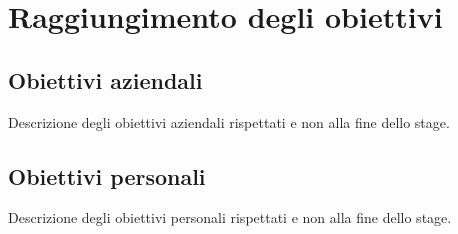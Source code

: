 \section{Raggiungimento degli obiettivi}
\label{sez:raggiungimento-obiettivi}

\subsection{Obiettivi aziendali}
\label{subsec:obiettivi-aziendali}

Descrizione degli obiettivi aziendali rispettati e non alla fine dello stage.\\

\subsection{Obiettivi personali}
\label{subsec:obiettivi-personali}

Descrizione degli obiettivi personali rispettati e non alla fine dello stage.\\
